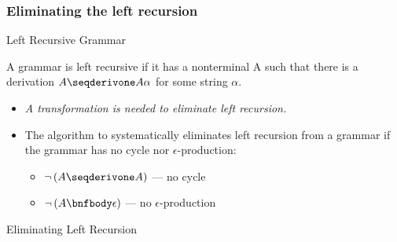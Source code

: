\begin{bibunit}[apalike]
\subsubsection{Eliminating the left recursion}

\tableofcontentslide[sectionstyle={show/shaded},subsectionstyle={show/shaded/hide},subsubsectionstyle={show/shaded/hide/hide}]

\begin{frame}{Left Recursive Grammar}
	\begin{definition}
		A grammar is left recursive if it has a nonterminal A such that there is a derivation $A \seqderivone A\alpha$ for some string $\alpha$.
	\end{definition}
	\begin{itemize}
	\vfill
	\item \emph{A transformation is needed to eliminate left recursion.}
	\vfill
	\item The algorithm to systematically eliminates left recursion from a grammar if the grammar has no cycle nor $\epsilon$-production: \begin{itemize}
		\item $\neg\left(A \seqderivone A\right)$ --- no cycle
		\item $\neg\left(A \bnfbody \epsilon\right)$ --- no $\epsilon$-production
		\end{itemize}
	\end{itemize}
\end{frame}

\begin{frame}{Eliminating Left Recursion}
	\begin{small}
	\begin{myalgorithm}
	\end{myalgorithm}
	\end{small}
\end{frame}


\end{bibunit}
